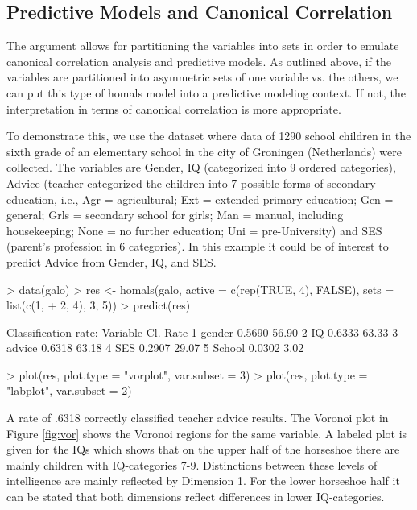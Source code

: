 \documentclass[article]{Z}
\begin{document}
\subsection{Predictive Models and Canonical Correlation}
\label{sec:pmcca}
The  argument allows for partitioning the variables into sets in order to emulate canonical correlation analysis and predictive models. As outlined above, if the variables are partitioned into asymmetric sets of one variable vs. the others, we can put this type of homals model into a predictive modeling context. If not, the interpretation in terms of canonical correlation is more appropriate. 

To demonstrate this, we use the  dataset \citep{Peschar:75} where data of 1290 school children in the sixth grade of an elementary school in the city of Groningen (Netherlands) were collected. The variables are Gender, IQ (categorized into 9 ordered categories), Advice (teacher categorized the children into 7 possible forms of secondary education, i.e., Agr = agricultural; Ext = extended primary education; Gen = general; 
Grls = secondary school for girls; Man = manual, including housekeeping; 
None = no further education; Uni = pre-University) and SES (parent's profession in 6 categories). In this example it could be of interest to predict Advice from Gender, IQ, and SES.

\begin{Schunk}
\begin{Sinput}
> data(galo)
> res <- homals(galo, active = c(rep(TRUE, 4), FALSE), sets = list(c(1, 
+     2, 4), 3, 5))
> predict(res)
\end{Sinput}
\begin{Soutput}
Classification rate:
  Variable Cl. Rate %
1   gender   0.5690     56.90
2       IQ   0.6333     63.33
3   advice   0.6318     63.18
4      SES   0.2907     29.07
5   School   0.0302      3.02
\end{Soutput}
\end{Schunk}

\begin{Schunk}
\begin{Sinput}
> plot(res, plot.type = "vorplot", var.subset = 3)
> plot(res, plot.type = "labplot", var.subset = 2)
\end{Sinput}
\end{Schunk}

A rate of .6318 correctly classified teacher advice results. The Voronoi plot in Figure \ref{fig:vor} shows the Voronoi regions for the same variable. A labeled plot is given for the IQs which shows that on the upper half of the horseshoe there are mainly children with IQ-categories 7-9. Distinctions between these levels of intelligence are mainly reflected by Dimension 1. For the lower horseshoe half it can be stated that both dimensions reflect differences in lower IQ-categories.
\end{document}
